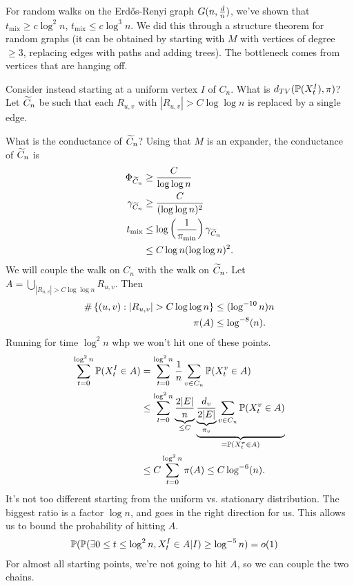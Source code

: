 For random walks on the Erd\H os-Renyi graph $G(n,\frac{d}{n})$, 
we've shown that $t_{\text{mix}}\ge c\log^2 n$, $t_{\text{mix}}\le c\log^3 n$. 
We did this through a structure theorem for random graphs (it can be obtained by starting with $M$ with vertices of degree $\ge 3$, replacing edges with paths  and adding trees).
The bottleneck comes from vertices that are hanging off.

Consider instead starting at a uniform vertex $I$ of $C_n$. What is $d_{TV}(\Pj(X_t^I), %
\pi)$?
Let $\widetilde{C}_n$ be such that each 
$R_{u,v}$ with $|R_{u,v}|>C\log \log n$ is replaced %
by a single edge. 

What is the conductance of $\widetilde{C}_n$?
Using that $M$ is an expander, the conductance of $\widetilde{C}_n$ is
\begin{align}
\Phi_{\widetilde{C}_n} 
&\ge \frac{C}{\log\log n}\\
\gamma_{\widetilde{C}_n} &\ge \frac{C}{(\log\log n)^2}\\
t_{\text{mix}} &\le \log \left( {\frac{1}{\pi_{\min}}} \right) \gamma_{\widetilde{C}_n}\\
&\le C\log n (\log \log n)^2.
\end{align}
We will couple the walk on $C_n$ with the walk on $\widetilde{C}_n$. 
Let $A=\bigcup_{|R_{n,v}| > C\log \log n} R_{u,v}$. Then
\begin{align}
\#\left\{{(u,v)}:{|R_{u,v}| > C\log\log n}\right\} &\le
(\log^{-10} n) n\\
\pi(A) &\le \log^{-8}(n).
\end{align}
Running for time $\log^2 n$ whp we won't hit one of these points.
\begin{align}
\sumz t{\log^2n} \Pj(X_t^I\in A)
&=\sumz t{\log^2n} \rc n \sum_{v\in C_n}
\Pj(X_t^v\in A)\\
&\le \sumz t{\log^2n} \ub{\fc{2|E|}{n}}{\le C}
\ub{
\ub{\fc{d_v}{2|E|}}{\pi_v} 
\sum_{v\in C_n} \Pj(X_t^v\in A)
}{=\Pj(X_t^\pi \in A)}\\
&\le C\sumz t{\log^2 n}\pi(A) \le C\log^{-6}(n).
%
\end{align}
It's not too different starting from the uniform vs. stationary distribution. The biggest ratio is a factor $\log n$, and goes in the right direction for us. This allows us to bound the probability of hitting $A$.
\begin{align}
\mathbb{P}(
\mathbb{P}(\exists 0\le t\le \log^2 n, 
X_t^I\in A|I) 
\ge \log^{-5}n
)&=o(1)
\end{align}
For almost all starting points, we're not going to hit $A$, so we can couple the two chains.
